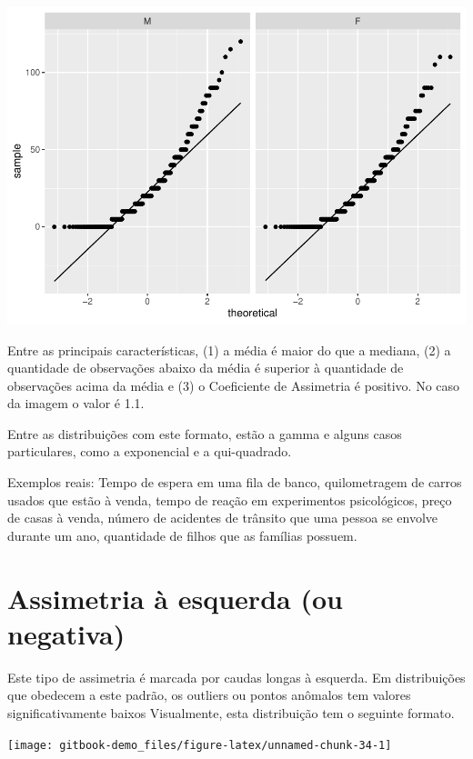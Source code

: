 \documentclass[
]{book}
\begin{document}
\begin{center}\includegraphics{gitbook-demo_files/figure-latex/unnamed-chunk-33-1} \end{center}

Entre as principais características, (1) a média é maior do que a mediana, (2) a quantidade de observações abaixo da média é superior à quantidade de observações acima da média e (3) o Coeficiente de Assimetria é positivo. No caso da imagem o valor é 1.1.

Entre as distribuições com este formato, estão a gamma e alguns casos particulares, como a exponencial e a qui-quadrado.

Exemplos reais: Tempo de espera em uma fila de banco, quilometragem de carros usados que estão à venda, tempo de reação em experimentos psicológicos, preço de casas à venda, número de acidentes de trânsito que uma pessoa se envolve durante um ano, quantidade de filhos que as famílias possuem.

\hypertarget{assimetria-uxe0-esquerda-ou-negativa}{%
\section{Assimetria à esquerda (ou negativa)}\label{assimetria-uxe0-esquerda-ou-negativa}}

Este tipo de assimetria é marcada por caudas longas à esquerda. Em distribuições que obedecem a este padrão, os outliers ou pontos anômalos tem valores significativamente baixos Visualmente, esta distribuição tem o seguinte formato.

\begin{center}\texttt{[image: gitbook-demo\_files/figure-latex/unnamed-chunk-34-1]} \end{center}
\end{document}
